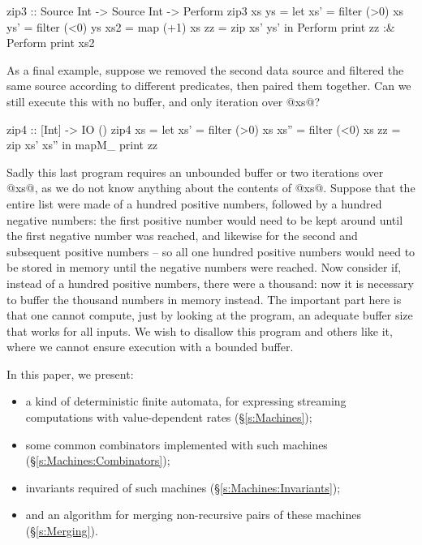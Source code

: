 \begin{code}
zip3 :: Source Int -> Source Int -> Perform
zip3 xs ys
 = let xs'  = filter (>0) xs
       ys'  = filter (<0) ys
       xs2  = map    (+1) xs
       zz   = zip xs' ys'
   in  Perform print      zz
   :&  Perform print      xs2
\end{code}

As a final example, suppose we removed the second data source and filtered the same source according to different predicates, then paired them together.
Can we still execute this with no buffer, and only iteration over @xs@?

\begin{code}
zip4 :: [Int] -> IO ()
zip4 xs
 = let xs'  = filter (>0) xs
       xs'' = filter (<0) xs
       zz   = zip xs' xs''
   in  mapM_ print        zz
\end{code}

Sadly this last program requires an unbounded buffer or two iterations over @xs@, as we do not know anything about the contents of @xs@.
Suppose that the entire list were made of a hundred positive numbers, followed by a hundred negative numbers: the first positive number would need to be kept around until the first negative number was reached, and likewise for the second and subsequent positive numbers -- so all one hundred positive numbers would need to be stored in memory until the negative numbers were reached.
Now consider if, instead of a hundred positive numbers, there were a thousand: now it is necessary to buffer the thousand numbers in memory instead.
The important part here is that one cannot compute, just by looking at the program, an adequate buffer size that works for all inputs.
We wish to disallow this program and others like it, where we cannot ensure execution with a bounded buffer.

In this paper, we present:
\begin{itemize}
\item a kind of deterministic finite automata, for expressing streaming computations with value-dependent rates (\S\ref{s:Machines});
\item some common combinators implemented with such machines (\S\ref{s:Machines:Combinators});
\item invariants required of such machines (\S\ref{s:Machines:Invariants});
\item and an algorithm for merging non-recursive pairs of these machines (\S\ref{s:Merging}).
\end{itemize}


